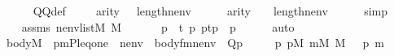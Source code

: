 \begin{isabellebody}
\ \ \ \ \isamarkupfalse%
\ QQ{\isacharunderscore}{\kern0pt}def\ \isacommand{{\isachardot}{\kern0pt}}\isamarkupfalse%
\isanewline
\ \ \isamarkupfalse%
\ {\isacartoucheopen}arity{\isacharparenleft}{\kern0pt}{\isasymphi}{\isacharparenright}{\kern0pt}\ {\isasymle}\ {\isacharunderscore}{\kern0pt}{\isacartoucheclose}\ {\isacartoucheopen}length{\isacharparenleft}{\kern0pt}nenv{\isacharparenright}{\kern0pt}\ {\isacharequal}{\kern0pt}\ {\isacharunderscore}{\kern0pt}{\isacartoucheclose}\isanewline
\ \ \isamarkupfalse%
\ {\isachardoublequoteopen}arity{\isacharparenleft}{\kern0pt}{\isasymphi}{\isacharparenright}{\kern0pt}\ {\isasymle}\ {}\ {\isacharhash}{\kern0pt}{\isacharplus}{\kern0pt}\ length{\isacharparenleft}{\kern0pt}nenv{\isacharparenright}{\kern0pt}{\isachardoublequoteclose}\isanewline
\ \ \ \ \isamarkupfalse%
\ simp\isanewline
\ \ \isamarkupfalse%
\isanewline
\ \ \isamarkupfalse%
\ assms\ {\isacartoucheopen}nenv{\isasymin}list{\isacharparenleft}{\kern0pt}M{\isacharparenright}{\kern0pt}{\isacartoucheclose}\ {\isacartoucheopen}{\isacharquery}{\kern0pt}{\isasympi}{\isasymin}M{\isacartoucheclose}\isanewline
\ \ \isamarkupfalse%
\isanewline
\ \ \isamarkupfalse%
\ {\isachardoublequoteopen}{\isasymrho}p{\isasymin}{\isacharquery}{\kern0pt}{\isasympi}\ {\isasymLongrightarrow}\ {\isasymexists}t\ p{\isachardot}{\kern0pt}\ {\isasymrho}p{\isacharequal}{\kern0pt}{\isasymlangle}t{\isacharcomma}{\kern0pt}p{\isasymrangle}{\isachardoublequoteclose}\ \ {\isasymrho}p\isanewline
\ \ \ \ \isamarkupfalse%
\ auto\isanewline
\ \ \isamarkupfalse%
\isanewline
\ \ \isamarkupfalse%
\ body{\isacharcolon}{\kern0pt}{\isachardoublequoteopen}M\ {\isacharcomma}{\kern0pt}\ {\isacharbrackleft}{\kern0pt}{\isasymalpha}{\isacharcomma}{\kern0pt}{\isasymrho}p{\isacharcomma}{\kern0pt}m{\isacharcomma}{\kern0pt}P{\isacharcomma}{\kern0pt}leq{\isacharcomma}{\kern0pt}one{\isacharbrackright}{\kern0pt}\ {\isacharat}{\kern0pt}\ nenv\ {\isasymTurnstile}\ body{\isacharunderscore}{\kern0pt}fm{\isacharparenleft}{\kern0pt}{\isasymphi}{\isacharcomma}{\kern0pt}nenv{\isacharparenright}{\kern0pt}\ {\isasymlongleftrightarrow}\ {\isacharquery}{\kern0pt}Q{\isacharparenleft}{\kern0pt}{\isasymrho}p{\isacharcomma}{\kern0pt}{\isasymalpha}{\isacharparenright}{\kern0pt}{\isachardoublequoteclose}\isanewline
\ \ \ \ \ {\isachardoublequoteopen}{\isasymrho}p{\isasymin}{\isacharquery}{\kern0pt}{\isasympi}{\isachardoublequoteclose}\ {\isachardoublequoteopen}{\isasymrho}p{\isasymin}M{\isachardoublequoteclose}\ {\isachardoublequoteopen}m{\isasymin}M{\isachardoublequoteclose}\ {\isachardoublequoteopen}{\isasymalpha}{\isasymin}M{\isachardoublequoteclose}\ \ {\isasymalpha}\ {\isasymrho}p\ m\isanewline

\end{isabellebody}
